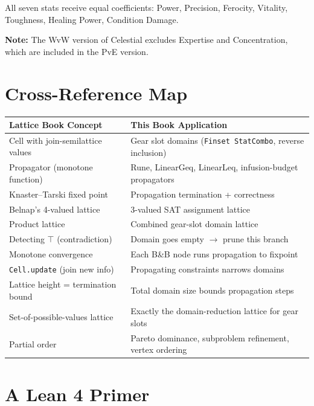\documentclass[11pt, a4paper, oneside]{book}
\begin{document}
All seven stats receive equal coefficients:
Power, Precision, Ferocity, Vitality, Toughness, Healing Power, Condition Damage.

\medskip\noindent
\textbf{Note:} The WvW version of Celestial excludes Expertise and
Concentration, which are included in the PvE version.

\chapter{Cross-Reference Map}
\label{app:crossref}

\begin{center}
\small
\begin{longtable}{p{5.5cm}p{7cm}}
\toprule
\textbf{Lattice Book Concept} & \textbf{This Book Application} \\
\midrule
\endhead
Cell with join-semilattice values &
  Gear slot domains (\texttt{Finset StatCombo}, reverse inclusion) \\
\addlinespace
Propagator (monotone function) &
  Rune, LinearGeq, LinearLeq, infusion-budget propagators \\
\addlinespace
Knaster--Tarski fixed point &
  Propagation termination + correctness \\
\addlinespace
Belnap's 4-valued lattice &
  3-valued SAT assignment lattice \\
\addlinespace
Product lattice &
  Combined gear-slot domain lattice \\
\addlinespace
Detecting $\top$ (contradiction) &
  Domain goes empty $\to$ prune this branch \\
\addlinespace
Monotone convergence &
  Each B\&B node runs propagation to fixpoint \\
\addlinespace
\texttt{Cell.update} (join new info) &
  Propagating constraints narrows domains \\
\addlinespace
Lattice height = termination bound &
  Total domain size bounds propagation steps \\
\addlinespace
Set-of-possible-values lattice &
  Exactly the domain-reduction lattice for gear slots \\
\addlinespace
Partial order &
  Pareto dominance, subproblem refinement, vertex ordering \\
\bottomrule
\end{longtable}
\end{center}

\chapter{A Lean 4 Primer}\label{app:primer}
\end{document}
